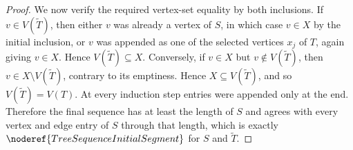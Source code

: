 \begin{proof}
We now verify the required vertex-set equality by both inclusions.  If
$v\in V(\widetilde T)$, then either $v$ was already a vertex of $S$, in
which case $v\in X$ by the initial inclusion, or $v$ was appended as one of
the selected vertices $x_j$ of $T$, again giving $v\in X$.  Hence
$V(\widetilde T)\subseteq X$.  Conversely, if $v\in X$ but
$v\notin V(\widetilde T)$, then $v\in X\setminus V(\widetilde T)$,
contrary to its emptiness.  Hence $X\subseteq V(\widetilde T)$, and so
$V(\widetilde T)=V(T)$.  At every induction step entries were appended only
at the end.  Therefore the final sequence has at least the length of $S$
and agrees with every vertex and edge entry of $S$ through that length,
which is exactly
$\noderef{TreeSequenceInitialSegment}$ for $S$ and $\widetilde T$.
\end{proof}
